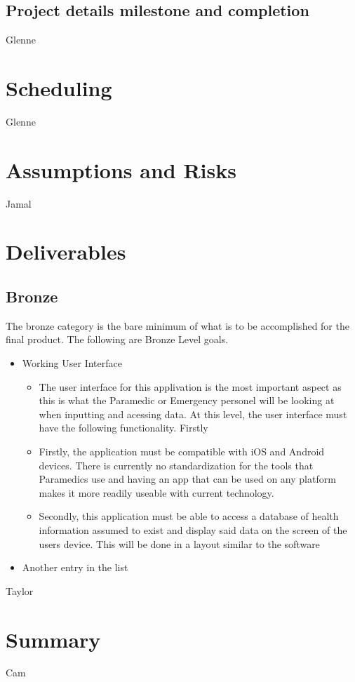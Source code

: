 \documentclass{article}
\begin{document}
\subsection{Project details milestone and completion}
Glenne
\section{Scheduling}
Glenne
\section{Assumptions and Risks}
Jamal
\section{Deliverables}
\subsection{Bronze}
The bronze category is the bare minimum of what is to be accomplished for the final product. The following are Bronze Level goals. 
\begin{itemize}
  \item Working User Interface
	\begin{itemize}
	\item The user interface for this applivation is the most important aspect as this is what the Paramedic or Emergency personel will be looking at when inputting and acessing data. At this level, the user interface must have the following functionality. Firstly
	\item Firstly, the application must be compatible with iOS and Android devices. There is currently no standardization for the tools that Paramedics use and having an app that can be used on any platform makes it more readily useable with current technology.
	\item Secondly, this application must be able to access a database of health information assumed to exist and display said data on the screen of the users device. This will be done in a layout similar to the software 
	\end{itemize}
  \item Another entry in the list
\end{itemize}
Taylor
\section{Summary}
Cam
\end{document}
